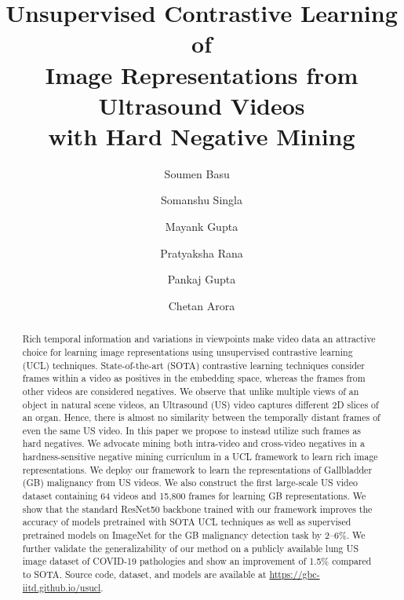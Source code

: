 \documentclass[runningheads]{llncs}
\begin{document}
%
\title{Unsupervised Contrastive Learning of \\ Image Representations from Ultrasound Videos \\ with Hard Negative Mining}
%
%
\author{
    Soumen Basu  \Letter ~  
    \and
    Somanshu Singla 
    \and
    Mayank Gupta 
    \and
    Pratyaksha Rana
    \and
    Pankaj Gupta
    \and
    Chetan Arora 
}

%
%
%
\maketitle              %
%

%
\begin{abstract}
	Rich temporal information and variations in viewpoints make video data an attractive choice for learning image representations using unsupervised contrastive learning (UCL) techniques. State-of-the-art (SOTA) contrastive learning techniques consider frames within a video as positives in the embedding space, whereas the frames from other videos are considered negatives. We observe that unlike multiple views of an object in natural scene videos, an Ultrasound (US) video captures different 2D slices of an organ. Hence, there is almost no similarity between the temporally distant frames of even the same US video. In this paper we propose to instead utilize such frames as hard negatives. We advocate mining both intra-video and cross-video negatives in a hardness-sensitive negative mining curriculum in a UCL framework to learn rich image representations. We deploy our framework to learn the representations of Gallbladder (GB) malignancy from US videos. We also construct the first large-scale US video dataset containing 64 videos and 15,800 frames for learning GB representations. We show that the standard ResNet50 backbone trained with our framework improves the accuracy of models pretrained with SOTA UCL techniques as well as supervised pretrained models on ImageNet for the GB malignancy detection task by 2--6\%. We further validate the generalizability of our method on a publicly available lung US image dataset of COVID-19 pathologies and show an improvement of 1.5\% compared to SOTA. Source code, dataset, and models are available at \url{https://gbc-iitd.github.io/usucl}.
	
\end{abstract}
\end{document}
